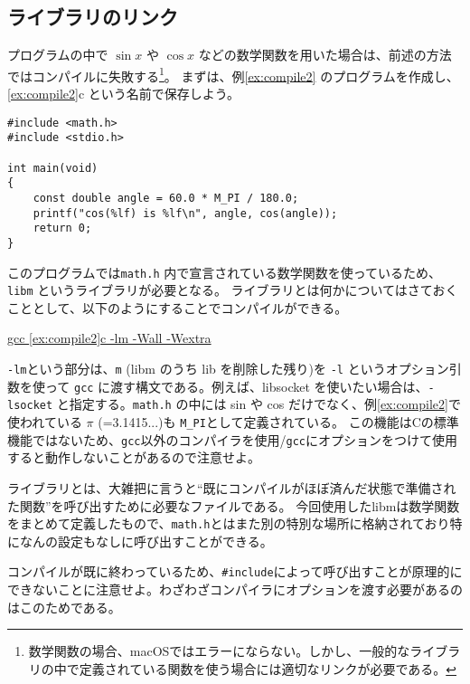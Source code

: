 \subsection{ライブラリのリンク}
プログラムの中で \(\sin x\) や \(\cos x\) などの数学関数を用いた場合は、前述の方法ではコンパイルに失敗する\footnote{数学関数の場合、macOSではエラーにならない。しかし、一般的なライブラリの中で定義されている関数を使う場合には適切なリンクが必要である。}。
まずは、例\ref{ex:compile2} のプログラムを作成し、\ref{ex:compile2}c という名前で保存しよう。
\begin{reidai}\label{ex:compile2}
    \begin{verbatim}
#include <math.h>
#include <stdio.h>

int main(void)
{
    const double angle = 60.0 * M_PI / 180.0;
    printf("cos(%lf) is %lf\n", angle, cos(angle));
    return 0;
}
\end{verbatim}
\end{reidai} \noindent
このプログラムでは\texttt{math.h} 内で宣言されている数学関数を使っているため、\texttt{libm} というライブラリが必要となる。
ライブラリとは何かについてはさておくこととして、以下のようにすることでコンパイルができる。
\begin{commandline2}
    \prompt \underline{gcc \ref{ex:compile2}c -lm -Wall -Wextra}
\end{commandline2} \noindent
\texttt{-lm}という部分は、\texttt{m} (libm のうち lib を削除した残り)を \texttt{-l} というオプション引数を使って \texttt{gcc} に渡す構文である。例えば、libsocket を使いたい場合は、\texttt{-lsocket} と指定する。\texttt{math.h} の中には sin や cos だけでなく、例\ref{ex:compile2}で使われている \(\pi\) (=3.1415...)も \texttt{M\_PI}として定義されている。
この機能はCの標準機能ではないため、\texttt{gcc}以外のコンパイラを使用/\texttt{gcc}にオプションをつけて使用すると動作しないことがあるので注意せよ。

ライブラリとは、大雑把に言うと``既にコンパイルがほぼ済んだ状態で準備された関数''を呼び出すために必要なファイルである。
今回使用したlibmは数学関数をまとめて定義したもので、\texttt{math.h}とはまた別の特別な場所に格納されており特になんの設定もなしに呼び出すことができる。

コンパイルが既に終わっているため、\texttt{\#include}によって呼び出すことが原理的にできないことに注意せよ。わざわざコンパイラにオプションを渡す必要があるのはこのためである。

